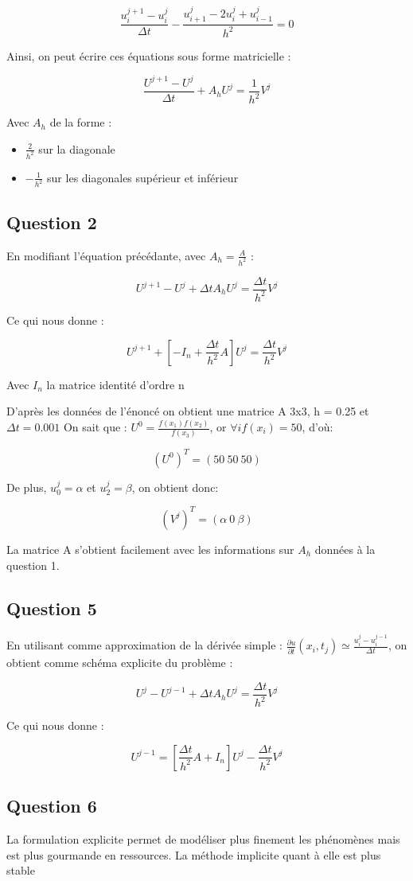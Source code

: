 \documentclass{article}
\begin{document}
$$\frac{u_i^{j+1} - u_i^{j}}{\Delta t} - \frac{u_{i+1}^j - 2u_i^j + u_{i-1}^j}{h^2} = 0$$

Ainsi, on peut écrire ces équations sous forme matricielle :

$$\frac{U^{j+1} - U^{j}}{\Delta t} + A_h U^j = \frac{1}{h^2}V^j$$
\newline
\newline

Avec $A_h$ de la forme :
\begin{itemize}
    \item $\frac{2}{h^2}$ sur la diagonale 
    \item $-\frac{1}{h^2}$ sur les diagonales supérieur et inférieur
\end{itemize}

\subsection{Question 2}
En modifiant l'équation précédante, avec $A_h = \frac{A}{h^2}$ :

$$U^{j+1} - U^j + \Delta t A_h U^j = \frac{\Delta t}{h^2}V^j$$

Ce qui nous donne :

$$ U^{j+1} + [-I_n + \frac{\Delta t}{h^2}A]U^j = \frac{\Delta t}{h^2}V^j$$

Avec $I_n$ la matrice identité d'ordre n
\newline

D'après les données de l'énoncé on obtient une matrice A 3x3, h = 0.25 et $\Delta t = 0.001$
\newline
\newline
On sait que : $U^0 = \frac{f(x_1)f(x_2)}{f(x_3)}$, or $\forall i f(x_i) = 50$, d'où:

$$(U^0)^T = (50 \ 50 \ 50)$$

De plus, $u_0^j = \alpha$ et $u_2^j = \beta$, on obtient donc:

$$(V^j)^T = (\alpha \ 0 \ \beta)$$

La matrice A s'obtient facilement avec les informations sur $A_h$ données à la question 1.

\subsection{Question 5}

En utilisant comme approximation de la dérivée simple : $\frac{\partial u}{\partial t}(x_i, t_j) \simeq \frac{u_i^j-u_i^{j-1}}{\Delta t}$, on obtient comme schéma explicite du problème :

$$U^j - U^{j-1} + \Delta t A_h U^j = \frac{\Delta t}{h^2}V^j$$

Ce qui nous donne :

$$U^{j-1} = [\frac{\Delta t}{h^2}A + I_n]U^j - \frac{\Delta t}{h^2}V^j$$

\subsection{Question 6}

La formulation explicite permet de modéliser plus finement les phénomènes mais est plus gourmande en ressources. La méthode implicite quant à elle est plus stable
\end{document}
